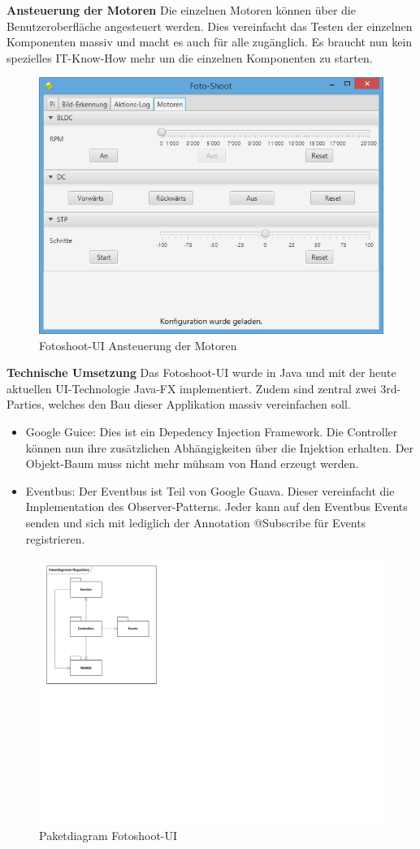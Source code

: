 \noindent
\textbf{Ansteuerung der Motoren}
Die einzelnen Motoren können über die Benutzeroberfläche angesteuert werden. Dies vereinfacht das Testen der einzelnen Komponenten massiv und macht es auch für alle zugänglich. Es braucht nun kein spezielles IT-Know-How mehr um die einzelnen Komponenten zu starten.

\begin{figure}[h!]
	\centering
	\includegraphics[width=0.7\linewidth]{../../fig/fotoshoot-ui/fotoshoot-ui-motoren}
	\caption{Fotoshoot-UI Ansteuerung der Motoren}
	\label{fig:fotoshoot-ui-motoren}
\end{figure}

\noindent
\textbf{Technische Umsetzung}
Das Fotoshoot-UI wurde in Java und mit der heute aktuellen UI-Technologie Java-FX implementiert. Zudem sind zentral zwei 3rd-Parties, welches den Bau dieser Applikation massiv vereinfachen soll.

\begin{itemize}
	\item Google Guice: Dies ist ein Depedency Injection Framework. Die Controller können nun ihre zusätzlichen Abhängigkeiten über die Injektion erhalten. Der Objekt-Baum muss nicht mehr mühsam von Hand erzeugt werden.
	\item Eventbus: Der Eventbus ist Teil von Google Guava. Dieser vereinfacht die Implementation des Observer-Patterns. Jeder kann auf den Eventbus Events senden und sich mit lediglich der Annotation @Subscribe für Events registrieren.
\end{itemize}
	
\begin{figure}[h!]
	\centering
	\includegraphics[width=0.7\linewidth]{../../fig/fotoshoot-ui/fotoshoot-ui-paketdiagramm}
	\caption{Paketdiagram Fotoshoot-UI}
	\label{fig:fotoshoot-ui-paketdiagramm}
\end{figure}
		
